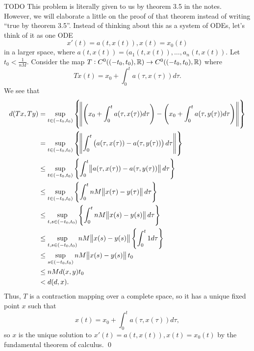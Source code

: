 \documentclass{article}
\begin{document}
\newpage
{} TODO
\hop
\solution
This problem is literally given to us by theorem 3.5 in the notes. However, we will elaborate a little on the proof of that theorem instead of writing ``true by theorem 3.5''. 
\hop 
Instead of thinking about this as a system of ODEs, let's think of it as one ODE 
\[x'(t) = a(t,x(t)), x(t) = x_0(t)\]
in a larger space, where $a(t,x(t)) = (a_1(t,x(t)), \dots, a_n(t,x(t))$. Let $t_0 < \frac{1}{nM}$. Consider the map $T: C^0((-t_0, t_0), \mathbb{R}) \to  C^0((-t_0, t_0), \mathbb{R})$ where
\[Tx(t) = x_0 + \int_0^ta(\tau,x(\tau))d\tau.\]
We see that 
\begin{align*}
    d(Tx,Ty) &= \sup_{t \in (-t_0,t_0)}\cbr{\norm{\del{x_0 + \int_0^ta(\tau,x(\tau))d\tau}-\del{x_0 + \int_0^ta(\tau,y(\tau))d\tau}}}\\
    &= \sup_{t \in (-t_0,t_0)}\cbr{\norm{\int_0^t\del{a(\tau,x(\tau))-a(\tau,y(\tau))}d\tau}}\\
    &\le \sup_{t \in (-t_0,t_0)}\cbr{\int_0^t\norm{a(\tau,x(\tau))-a(\tau,y(\tau))}d\tau}\\
    & \le  \sup_{t \in (-t_0,t_0)}\cbr{\int_0^tnM\norm{x(\tau)-y(\tau)}d\tau} \\
    & \le  \sup_{t, s \in (-t_0,t_0)}\cbr{\int_0^tnM\norm{x(s)-y(s)}d\tau} \\
    & \le  \sup_{t, s \in (-t_0,t_0)}nM\norm{x(s)-y(s)}\cbr{\int_0^t1d\tau} \\
    & \le  \sup_{s \in (-t_0,t_0)}nM\norm{x(s)-y(s)}t_0\\
    & \le nMd(x,y)t_0\\
    & < d(d,x).
\end{align*}
Thus, $T$ is a contraction mapping over a complete space, so it has a unique fixed point $x$ such that 
\[x(t) = x_0 + \int_0^ta(\tau,x(\tau))d\tau,\]
so $x$ is the unique solution to $x'(t) = a(t,x(t)), x(t) = x_0(t)$ by the fundamental theorem of calculus. 
\qed
\end{document}
